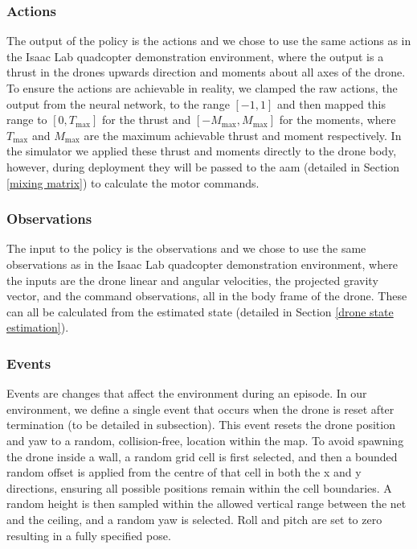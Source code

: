 \documentclass{report_template_oxford}
\begin{document}
\subsubsection{Actions}
The output of the policy is the actions and we chose to use the same actions as in the Isaac Lab quadcopter demonstration environment, where the output is a thrust in the drones upwards direction and moments about all axes of the drone. To ensure the actions are achievable in reality, we clamped the raw actions, the output from the neural network, to the range $[-1, 1]$ and then mapped this range to $[0,T_{\mathrm{max}}]$ for the thrust and $[-M_{\mathrm{max}},M_{\mathrm{max}}]$ for the moments, where $T_{\mathrm{max}}$ and $M_{\mathrm{max}}$ are the maximum achievable thrust and moment respectively. In the simulator we applied these thrust and moments directly to the drone body, however, during deployment they will be passed to the \gls{aam} (detailed in Section \ref{mixing matrix}) to calculate the motor commands.

\subsubsection{Observations}
The input to the policy is the observations and we chose to use the same observations as in the Isaac Lab quadcopter demonstration environment, where the inputs are the drone linear and angular velocities, the projected gravity vector, and the command observations, all in the body frame of the drone. These can all be calculated from the estimated state (detailed in Section \ref{drone state estimation}).

\subsubsection{Events}
Events are changes that affect the environment during an episode. In our environment, we define a single event that occurs when the drone is reset after termination (to be detailed in subsection). This event resets the drone position and yaw to a random, collision-free, location within the map. To avoid spawning the drone inside a wall, a random grid cell is first selected, and then a bounded random offset is applied from the centre of that cell in both the x and y directions, ensuring all possible positions remain within the cell boundaries. A random height is then sampled within the allowed vertical range between the net and the ceiling, and a random yaw is selected. Roll and pitch are set to zero resulting in a fully specified pose.
\end{document}

